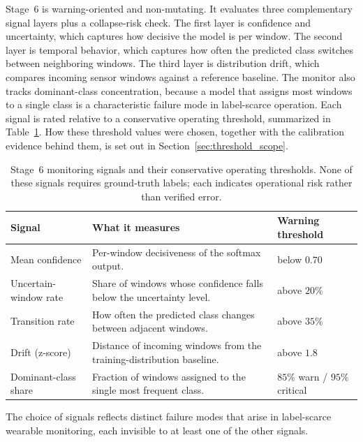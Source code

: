 Stage~6 is warning-oriented and non-mutating. It evaluates three complementary signal layers plus a
collapse-risk check. The first layer is confidence and uncertainty, which captures how decisive the
model is per window. The second layer is temporal behavior, which captures how often the predicted
class switches between neighboring windows. The third layer is distribution drift, which compares
incoming sensor windows against a reference baseline. The monitor also tracks
dominant-class concentration, because a model that assigns most windows to a single class is a
characteristic failure mode in label-scarce operation. Each signal is rated relative to a conservative
operating threshold, summarized in Table~\ref{tab:monitoring_signals}. How these threshold values were chosen, together with the calibration evidence behind them, is set out in Section~\ref{sec:threshold_scope}.

\renewcommand{\arraystretch}{1.2}
\begin{table}[htbp]
\centering
\footnotesize
\caption[Stage~6 monitoring signals and their conservative operating thresholds]{Stage~6 monitoring signals and their conservative operating thresholds. None of these
signals requires ground-truth labels; each indicates operational risk rather than verified error.}
\label{tab:monitoring_signals}
\begin{tabularx}{\textwidth}{p{3.2cm} X p{3.0cm}}
\toprule
\textbf{Signal} & \textbf{What it measures} & \textbf{Warning threshold} \\
\midrule
Mean confidence & Per-window decisiveness of the softmax output. & below \(0.70\) \\
Uncertain-window rate & Share of windows whose confidence falls below the uncertainty level. & above \(20\%\) \\
Transition rate & How often the predicted class changes between adjacent windows. & above \(35\%\) \\
Drift (z-score) & Distance of incoming windows from the training-distribution baseline. & above \(1.8\) \\
Dominant-class share & Fraction of windows assigned to the single most frequent class. & \(85\%\) warn / \(95\%\) critical \\
\bottomrule
\end{tabularx}
\renewcommand{\arraystretch}{1.0}
\end{table}

The choice of signals reflects distinct failure modes that arise in label-scarce wearable monitoring, each invisible to at least one of the other signals.

